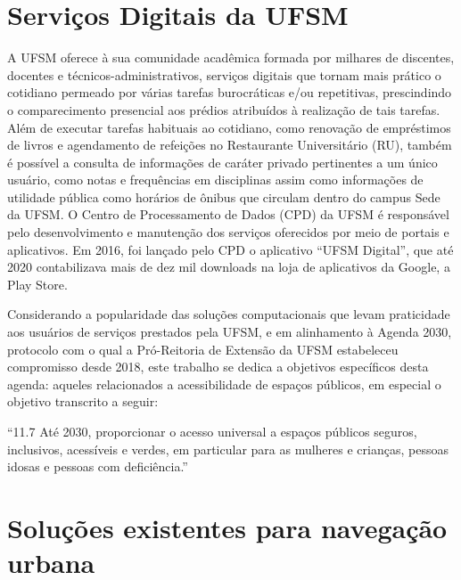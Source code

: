 \documentclass[oneside,openright,12pt]{ufsm_2015} %
\begin{document}
\section{Serviços Digitais da UFSM}

A UFSM oferece à sua comunidade acadêmica formada por milhares de discentes, docentes e técnicos-administrativos, serviços digitais que tornam mais prático o cotidiano permeado por várias tarefas burocráticas e/ou repetitivas, prescindindo o comparecimento presencial aos prédios atribuídos à realização de tais tarefas.
Além de executar tarefas habituais ao cotidiano, como renovação de empréstimos de livros e agendamento de refeições no Restaurante Universitário (RU), também é possível a consulta de informações de caráter privado pertinentes a um único usuário, como notas e frequências em disciplinas assim como informações de utilidade pública como horários de ônibus que circulam dentro do campus Sede da UFSM.
O Centro de Processamento de Dados (CPD) da UFSM é responsável pelo desenvolvimento e manutenção dos serviços oferecidos por meio de portais e aplicativos. 
Em 2016, foi lançado pelo CPD o aplicativo ``UFSM Digital'', que até 2020 contabilizava mais de dez mil downloads na loja de aplicativos da Google, a Play Store.

Considerando a popularidade das soluções computacionais que levam praticidade aos usuários de serviços prestados pela UFSM, e em alinhamento à Agenda 2030, protocolo com o qual a Pró-Reitoria de Extensão da UFSM estabeleceu compromisso desde 2018, este trabalho se dedica a objetivos específicos desta agenda: aqueles relacionados a acessibilidade de espaços públicos, em especial o objetivo transcrito a seguir:

``11.7 Até 2030, proporcionar o acesso universal a espaços públicos seguros, inclusivos, acessíveis e verdes, em particular para as mulheres e crianças, pessoas idosas e pessoas com deficiência.''  \cite{agenda:2030}

\section{Soluções existentes para navegação urbana}
\end{document}
